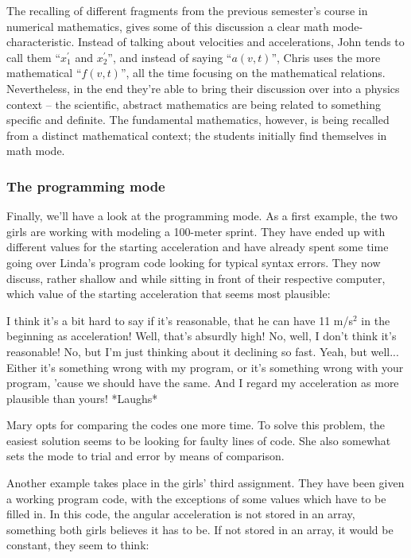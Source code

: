 \documentclass[aps,prb,floatfix,twocolumn,twoside,english]{revtex4-1}
\begin{document}
The recalling of different fragments from the previous semester's course in numerical mathematics, gives some of this discussion a clear math mode-characteristic. Instead of talking about velocities and accelerations, John tends to call them ``$x_1^{\prime}$ and $x_2^{\prime}$'', and instead of saying ``$a(v,t)$'', Chris uses the more mathematical ``$f(v,t)$'', all the time focusing on the mathematical relations. Nevertheless, in the end they're able to bring their discussion over into a physics context -- the scientific, abstract mathematics are being related to something specific and definite. The fundamental mathematics, however, is being recalled from a distinct mathematical context; the students initially find themselves in math mode.

\subsubsection*{The programming mode}
Finally, we'll have a look at the programming mode. As a first example, the two girls are working with modeling a 100-meter sprint. They have ended up with different values for the starting acceleration and have already spent some time going over Linda's program code looking for typical syntax errors. They now discuss, rather shallow and while sitting in front of their respective computer, which value of the starting acceleration that seems most plausible:

\begin{dialogue}
\small
{} I think it's a bit hard to say if it's reasonable, that he can have 11 m/s$^2$ in the beginning as acceleration! Well, that's absurdly high!
 No, well, I don't think it's reasonable!
 No, but I'm just thinking about it declining so fast.
 Yeah, but well... Either it's something wrong with my program, or it's something wrong with your program, 'cause we should have the same. And I regard my acceleration as more plausible than yours! *Laughs*
\end{dialogue}

Mary opts for comparing the codes one more time. To solve this problem, the easiest solution seems to be looking for faulty lines of code. She also somewhat sets the mode to trial and error by means of comparison. 

Another example takes place in the girls' third assignment. They have been given a working program code, with the exceptions of some values which have to be filled in. In this code, the angular acceleration is not stored in an array, something both girls believes it has to be. If not stored in an array, it would be constant, they seem to think:
\end{document}
